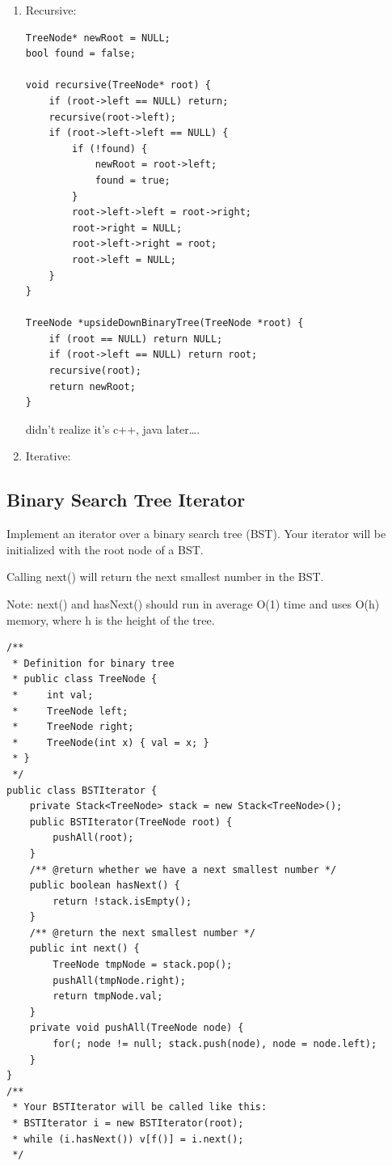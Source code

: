 \documentclass[12pt]{book}
\begin{document}
\begin{enumerate}
\item Recursive:
\label{sec-4-5-7-1}

\lstset{language=java,label= ,caption= ,numbers=none}
\begin{lstlisting}
TreeNode* newRoot = NULL;
bool found = false;

void recursive(TreeNode* root) {
    if (root->left == NULL) return;
    recursive(root->left);
    if (root->left->left == NULL) {
        if (!found) {
            newRoot = root->left;
            found = true;
        }
        root->left->left = root->right;
        root->right = NULL;
        root->left->right = root;
        root->left = NULL;
    }
}

TreeNode *upsideDownBinaryTree(TreeNode *root) {
    if (root == NULL) return NULL;
    if (root->left == NULL) return root;
    recursive(root);
    return newRoot;
}
\end{lstlisting}

didn't realize it's c++, java later\ldots{}.
\item Iterative:
\label{sec-4-5-7-2}
\end{enumerate}

\subsection{Binary Search Tree Iterator}
\label{sec-4-5-8}
Implement an iterator over a binary search tree (BST). Your iterator will be initialized with the root node of a BST.

Calling next() will return the next smallest number in the BST.

Note: next() and hasNext() should run in average O(1) time and uses O(h) memory, where h is the height of the tree.

\lstset{language=java,label= ,caption= ,numbers=none}
\begin{lstlisting}
/**
 * Definition for binary tree
 * public class TreeNode {
 *     int val;
 *     TreeNode left;
 *     TreeNode right;
 *     TreeNode(int x) { val = x; }
 * }
 */
public class BSTIterator {
    private Stack<TreeNode> stack = new Stack<TreeNode>();
    public BSTIterator(TreeNode root) {
        pushAll(root);
    }
    /** @return whether we have a next smallest number */
    public boolean hasNext() {
        return !stack.isEmpty();
    }
    /** @return the next smallest number */
    public int next() {
        TreeNode tmpNode = stack.pop();
        pushAll(tmpNode.right);
        return tmpNode.val;
    }
    private void pushAll(TreeNode node) {
        for(; node != null; stack.push(node), node = node.left);
    }
}
/**
 * Your BSTIterator will be called like this:
 * BSTIterator i = new BSTIterator(root);
 * while (i.hasNext()) v[f()] = i.next();
 */
\end{lstlisting}
\end{document}
